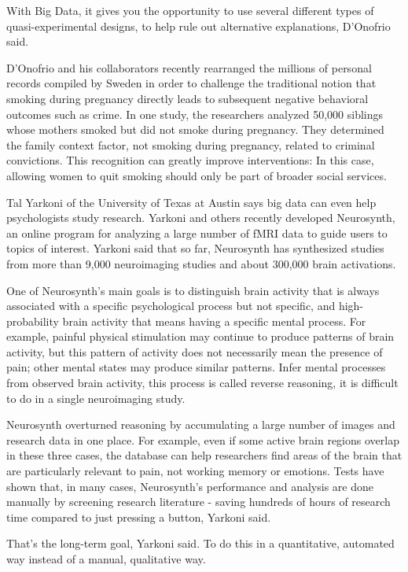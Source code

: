With Big Data, it gives you the opportunity to use several different 
types of quasi-experimental designs, to help rule out alternative 
explanations, D’Onofrio said\cite{editor01}.

D'Onofrio and his collaborators recently rearranged the millions of 
personal records compiled by Sweden in order to challenge the traditional 
notion that smoking during pregnancy directly leads to subsequent negative 
behavioral outcomes such as crime. In one study, the researchers analyzed 
50,000 siblings whose mothers smoked but did not smoke during pregnancy. 
They determined the family context factor, not smoking during pregnancy, 
related to criminal convictions. This recognition can greatly improve 
interventions: 
In this case, allowing women to quit smoking should only be part of 
broader social services.

Tal Yarkoni of the University of Texas at Austin says big data can 
even help psychologists study research. Yarkoni and others recently 
developed Neurosynth, an online program for analyzing a large number 
of fMRI data to guide users to topics of interest. Yarkoni said that 
so far, Neurosynth has synthesized studies from more than 9,000 
neuroimaging studies and about 300,000 brain activations.

One of Neurosynth's main goals is to distinguish brain activity that 
is always associated with a specific psychological process but not 
specific, and high-probability brain activity that means having a 
specific mental process. For example, painful physical stimulation 
may continue to produce patterns of brain activity, but this pattern 
of activity does not necessarily mean the presence of pain; other 
mental states may produce similar patterns. Infer mental processes 
from observed brain activity, this process is called reverse 
reasoning, it is difficult to do in a single neuroimaging study.

Neurosynth overturned reasoning by accumulating a large number of 
images and research data in one place. For example, even if some 
active brain regions overlap in these three cases, the database can 
help researchers find areas of the brain that are particularly relevant 
to pain, not working memory or emotions. Tests have shown that, in many 
cases, Neurosynth's performance and analysis are done manually by 
screening research literature - saving hundreds of hours of research 
time compared to just pressing a button, Yarkoni said.

That’s the long-term goal, Yarkoni said. To do this in a quantitative, 
automated way instead of a manual, qualitative way\cite{editor01}.

